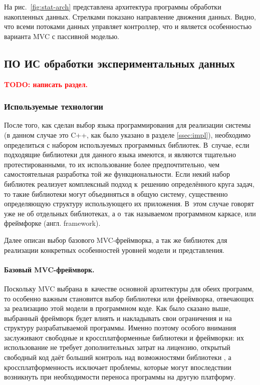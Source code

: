 \documentclass[a4paper, 14pt, titlepage]{extarticle}
\newcommand{\todo}[1]{\textbf{\textcolor{red}{TODO: #1}}}
\newcommand{\eng}[1]{\foreignlanguage{english}{#1}}
\begin{document}
  На рис.~\ref{fig:stat-arch} представлена архитектура программы обработки накопленных данных. Стрелками
  показано направление движения данных. Видно, что всеми потоками данных управляет контроллер, что и
  является особенностью варианта MVC с пассивной моделью.

  \subsection{ПО ИС обработки экспериментальных данных}

  \todo{написать раздел.}

  \subsubsection{Используемые технологии}\label{ssec:techno}

  После того, как сделан выбор языка программирования для реализации системы (в данном случае это
  C++, как было указано в разделе \ref{ssec:impl}), необходимо определиться с набором используемых
  программных библиотек. В~случае, если подходящие библиотеки для данного языка имеются, и являются тщательно
  протестированными, то их использование более предпочтительно, чем самостоятельная разработка той
  же функциональности. Если некий набор библиотек реализует комплексный подход к~решению
  определённого круга задач, то такие библиотеки могут объединяться в общую систему, существенно
  определяющую структуру использующего их приложения. В~этом случае говорят уже не об отдельных
  библиотеках, а о~так называемом программном каркасе, или фреймфорке (англ. \eng{framework}).

  Далее описан выбор базового MVC-фреймворка, а так же библиотек для реализации
  конкретных особенностей уровней модели и представления.

  \paragraph{Базовый MVC-фреймворк.}
  Поскольку MVC выбрана в~качестве основной архитектуры для обеих программ, то особенно важным
  становится выбор библиотеки или фреймворка, отвечающих за реализацию этой модели в программном
  коде. Как было сказано выше, выбранный фреймворк будет влиять и накладывать свои ограничения и на
  структуру разрабатываемой программы. Именно поэтому особого внимания заслуживают свободные и
  кроссплатформенные библиотеки и фреймворки: их использование не требует дополнительных затрат на
  лицензию, открытый свободный код даёт больший контроль над возможностями библиотеки \cite{open-source},
  а кроссплатформенность исключает проблемы, которые могут впоследствии возникнуть при необходимости
  переноса программы на другую платформу.
\end{document}
